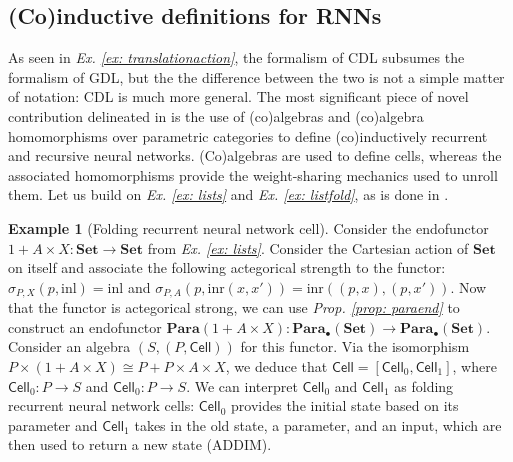 \documentclass[12pt,a4paper,openright,twoside]{report}
\theoremstyle{plain}
\theoremstyle{definition}
\newtheorem{example}[proposition]{Example}
\begin{document}
\subsection{(Co)inductive definitions for RNNs}

As seen in \textit{Ex. \ref{ex: translationaction}}, the formalism of CDL subsumes the formalism of GDL, but the the difference between the two is not a simple matter of notation: CDL is much more general. The most significant piece of novel contribution delineated in \cite{gavranovicposition} is the use of (co)algebras and (co)algebra homomorphisms over parametric categories to define (co)inductively recurrent and recursive neural networks. (Co)algebras are used to define cells, whereas the associated homomorphisms provide the weight-sharing mechanics used to unroll them. Let us build on \textit{Ex. \ref{ex: lists}} and \textit{Ex. \ref{ex: listfold}}, as is done in \cite{gavranovicposition}.

\begin{example}[Folding recurrent neural network cell]
  \label{ex: frnncell}
  Consider the endofunctor $1 + A \times X: \mathbf{Set} \to \mathbf{Set}$ from \textit{Ex. \ref{ex: lists}}. Consider the Cartesian action of $\mathbf{Set}$ on itself and associate the following actegorical strength to the functor: $\sigma_{P,X}(p,\mathrm{inl}) = \mathrm{inl}$ and  $\sigma_{P,A}(p,\mathrm{inr}(x,x')) = \mathrm{inr}((p,x), (p,x'))$. Now that the functor is actegorical strong, we can use \textit{Prop. \ref{prop: paraend}} to construct an endofunctor $\mathbf{Para}(1 + A \times X): \mathbf{Para}_{\bullet}(\mathbf{Set}) \to \mathbf{Para}_{\bullet}(\mathbf{Set})$. Consider an algebra $(S,(P,\mathsf{Cell}))$ for this functor. Via the isomorphism $P \times (1 + A \times X) \cong P + P \times A \times X$, we deduce that $\mathsf{Cell} = [\mathsf{Cell}_0, \mathsf{Cell}_1]$, where $\mathsf{Cell}_0: P \to S$ and  $\mathsf{Cell}_0: P \to S$. We can interpret $\mathsf{Cell}_0$ and $\mathsf{Cell}_1$ as folding recurrent neural network cells: $\mathsf{Cell}_0$ provides the initial state based on its parameter and $\mathsf{Cell}_1$ takes in the old state, a parameter, and an input, which are then used to return a new state (ADDIM).
\end{example}
\end{document}
